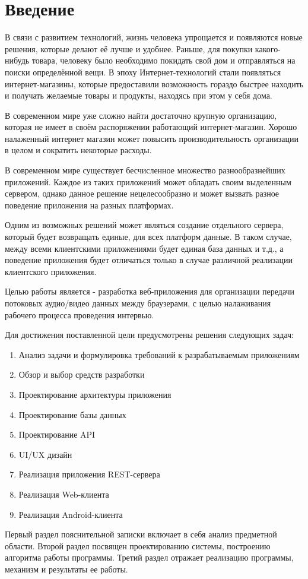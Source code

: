\label{sec:intro}
\section*{Введение}\indent

В связи с развитием технологий, жизнь человека упрощается и появляются новые решения, которые делают её лучше и удобнее. Раньше, для покупки какого-нибудь товара, человеку было необходимо покидать свой дом и отправляться на поиски определённой вещи. В эпоху Интернет-технологий стали появляться интернет-магазины, которые предоставили возможность гораздо быстрее находить и получать желаемые товары и продукты, находясь при этом у себя дома.

В современном мире уже сложно найти достаточно крупную организацию, которая не имеет в своём распоряжении работающий интернет-магазин. Хорошо налаженный интернет магазин может повысить производительность организации в целом и сократить некоторые расходы.

В современном мире существует бесчисленное множество разнообразнейших приложений. Каждое из таких приложений может обладать своим выделенным сервером, однако данное решение нецелесообразно и может вызвать разное поведение приложения на разных платформах.

Одним из возможных решений может являться создание отдельного сервера, который будет возвращать единые, для всех платформ данные. В таком случае, между всеми клиентскими приложениями будет единая база данных и т.д., а поведение приложения будет отличаться только в случае различной реализации клиентского приложения.

Целью работы является - разработка веб-приложения для организации передачи потоковых аудио/видео данных между браузерами, с целью налаживания рабочего процесса проведения интервью.

Для достижения поставленной цели предусмотрены решения следующих задач:

\begin{enumerate}
    \item Анализ задачи и формулировка требований к разрабатываемым приложениям
    \item Обзор и выбор средств разработки
    \item Проектирование архитектуры приложения
    \item Проектирование базы данных
    \item Проектирование API
    \item UI/UX дизайн
    \item Реализация приложения REST-сервера
    \item Реализация Web-клиента
    \item Реализация Android-клиента
\end{enumerate}

Первый раздел пояснительной записки включает в себя анализ предметной области.
Второй раздел посвящен проектированию системы, построению алгоритма работы программы.
Третий раздел отражает реализацию программы, механизм и результаты ее работы.
